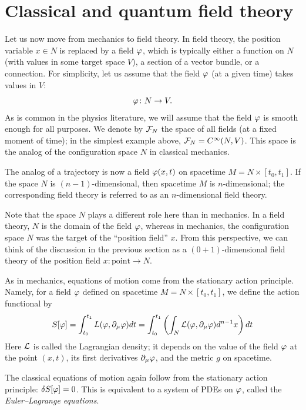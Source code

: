 \section{Classical and quantum field theory}\label{s:field-theory}
Let us now move from mechanics to field theory. In field theory,
the position variable $x\in N$ is replaced by a field $\varphi$,
which is typically either a function on $N$ (with values in some target space
$V$), a section of a vector bundle, or a connection. For simplicity, let us
assume that the field $\varphi$ (at a given time) takes values in $V$:
\begin{equation*}
	\varphi\colon N \rightarrow V.
\end{equation*}
As is common in the physics literature, we will assume that the field $\varphi$
is smooth enough for all purposes. We denote by $\mathcal{F}_N$ the space of all
fields (at a fixed moment of time); in the simplest example above,
$\mathcal{F}_N=C^\infty (N,V)$. This space is the analog of the configuration space
$N$ in classical mechanics.

The analog of a trajectory is now a field $\varphi(x,t)$ on spacetime $M = N
\times [t_0,t_1]$. If the space $N$ is $(n-1)$-dimensional, then
spacetime $M$ is $n$-dimensional; the corresponding field theory is referred
to as an $n$-dimensional field theory.


 Note that the space $N$ plays a different role here than in mechanics. In
 a field theory, $N$ is the domain of the field $\varphi$, whereas in mechanics, the
 configuration space $N$ was the target of the ``position field'' $x$. From this
 perspective, we can think of the discussion in the previous section as a
 $(0+1)$-dimensional field theory of the position field $x\colon \text{point}
 \to N$.

As in mechanics, equations of motion come from the stationary action principle.
Namely, for a field $\varphi$ defined on spacetime $M=N\times[t_0, t_1]$, we define
the action functional by
\begin{equation}
	S[\varphi] = \int_{t_0}^{t_1} L(\varphi, \partial_{\mu} \varphi) dt = \int_{t_0}^{t_1} \left(
	\int_N \mathcal{L}(\varphi, \partial_{\mu} \varphi) d^{n-1} x \right) dt
\end{equation}
Here $\mathcal{L}$ is called the Lagrangian density; it depends on the value of the
field $\varphi$ at the point $(x,t)$, its first derivatives $\partial_\mu \varphi$, and the
metric $g$ on spacetime.

The classical equations of motion again follow from the stationary action
principle: $\delta S[\varphi]=0$. This is equivalent to a system of PDEs on
$\varphi$, called the \emph{Euler--Lagrange equations}.

